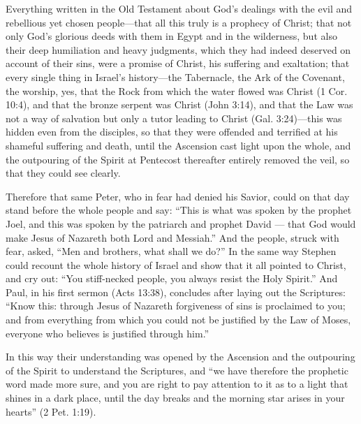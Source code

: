 Everything written in the Old Testament about God’s dealings with the evil and rebellious yet chosen people—that all this truly is a prophecy of Christ; that not only God’s glorious deeds with them in Egypt and in the wilderness, but also their deep humiliation and heavy judgments, which they had indeed deserved on account of their sins, were a promise of Christ, his suffering and exaltation; that every single thing in Israel’s history—the Tabernacle, the Ark of the Covenant, the worship, yes, that the Rock from which the water flowed was Christ (1 Cor. 10:4), and that the bronze serpent was Christ (John 3:14), and that the Law was not a way of salvation but only a tutor leading to Christ (Gal. 3:24)—this was hidden even from the disciples, so that they were offended and terrified at his shameful suffering and death, until the Ascension cast light upon the whole, and the outpouring of the Spirit at Pentecost thereafter entirely removed the veil, so that they could see clearly.

Therefore that same Peter, who in fear had denied his Savior, could on that day stand before the whole people and say: “This is what was spoken by the prophet Joel, and this was spoken by the patriarch and prophet David — that God would make Jesus of Nazareth both Lord and Messiah.” And the people, struck with fear, asked, “Men and brothers, what shall we do?” In the same way Stephen could recount the whole history of Israel and show that it all pointed to Christ, and cry out: “You stiff-necked people, you always resist the Holy Spirit.” And Paul, in his first sermon (Acts 13:38), concludes after laying out the Scriptures: “Know this: through Jesus of Nazareth forgiveness of sins is proclaimed to you; and from everything from which you could not be justified by the Law of Moses, everyone who believes is justified through him.”

In this way their understanding was opened by the Ascension and the outpouring of the Spirit to understand the Scriptures, and “we have therefore the prophetic word made more sure, and you are right to pay attention to it as to a light that shines in a dark place, until the day breaks and the morning star arises in your hearts” (2 Pet. 1:19).

